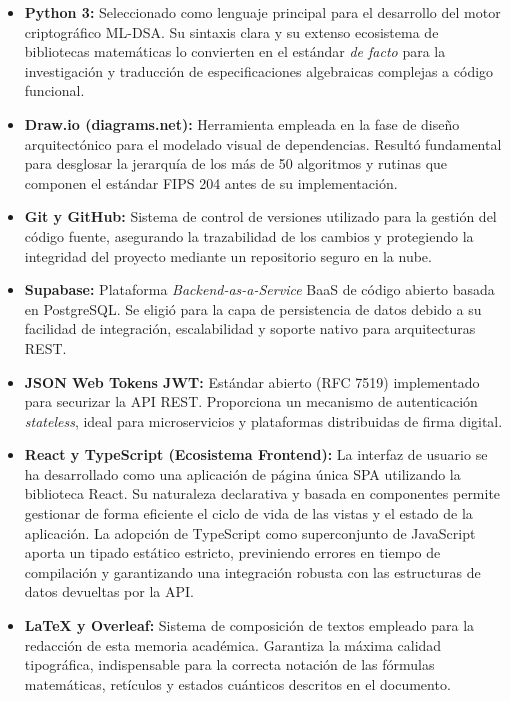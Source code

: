 \documentclass[11pt, a4paper]{report}
\theoremstyle{definition}
\begin{document}
\begin{itemize}
    \item \textbf{Python 3:} Seleccionado como lenguaje principal para el desarrollo del motor criptográfico ML-DSA. Su sintaxis clara y su extenso ecosistema de bibliotecas matemáticas lo convierten en el estándar \textit{de facto} para la investigación y traducción de especificaciones algebraicas complejas a código funcional.
    
    \item \textbf{Draw.io (diagrams.net):} Herramienta empleada en la fase de diseño arquitectónico para el modelado visual de dependencias. Resultó fundamental para desglosar la jerarquía de los más de 50 algoritmos y rutinas que componen el estándar FIPS 204 antes de su implementación.
    
    \item \textbf{Git y GitHub:} Sistema de control de versiones utilizado para la gestión del código fuente, asegurando la trazabilidad de los cambios y protegiendo la integridad del proyecto mediante un repositorio seguro en la nube.
    
    \item \textbf{Supabase:} Plataforma \textit{Backend-as-a-Service} BaaS de código abierto basada en PostgreSQL. Se eligió para la capa de persistencia de datos debido a su facilidad de integración, escalabilidad y soporte nativo para arquitecturas REST.
    
    \item \textbf{JSON Web Tokens JWT:} Estándar abierto (RFC 7519) implementado para securizar la API REST. Proporciona un mecanismo de autenticación \textit{stateless}, ideal para microservicios y plataformas distribuidas de firma digital.
    
    \item \textbf{React y TypeScript (Ecosistema Frontend):} La interfaz de usuario se ha desarrollado como una aplicación de página única SPA utilizando la biblioteca React. Su naturaleza declarativa y basada en componentes permite gestionar de forma eficiente el ciclo de vida de las vistas y el estado de la aplicación. La adopción de TypeScript como superconjunto de JavaScript aporta un tipado estático estricto, previniendo errores en tiempo de compilación y garantizando una integración robusta con las estructuras de datos devueltas por la API.
    
    \item \textbf{LaTeX y Overleaf:} Sistema de composición de textos empleado para la redacción de esta memoria académica. Garantiza la máxima calidad tipográfica, indispensable para la correcta notación de las fórmulas matemáticas, retículos y estados cuánticos descritos en el documento.
\end{itemize}
\end{document}
